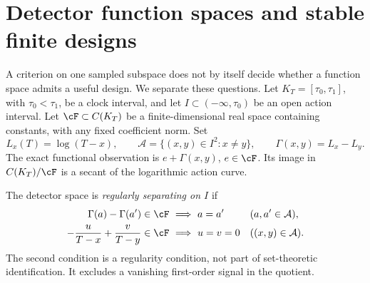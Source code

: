 \section{Detector function spaces and stable finite designs}
\label{sec:v84-spaces}
A criterion on one sampled subspace does not by itself decide whether a
function space admits a useful design. We separate these questions.
Let $K_T=[\tau_0,\tau_1]$, with $\tau_0<\tau_1$, be a clock interval,
and let $I\subset(-\infty,\tau_0)$ be an open action interval.
Let $\cF\subset C(K_T)$ be a finite-dimensional real space containing
constants, with any fixed coefficient norm. Set
\[
 L_x(T)=\log(T-x),\qquad
 \mathcal A=\{(x,y)\in I^2:x\ne y\},\qquad
 \Gamma(x,y)=L_x-L_y.
\]
The exact functional observation is $e+\Gamma(x,y)$, $e\in\cF$.
Its image in $C(K_T)/\cF$ is a secant of the logarithmic action curve.

\begin{definition}\label{def:v84-regular}
The detector space is \emph{regularly separating on $I$} if
\begin{align}
 \Gamma(a)-\Gamma(a')\in\cF&\ \Longrightarrow\ a=a'
                  &&(a,a'\in\mathcal A),\label{eq:v84-secants}\\
 -\frac{u}{T-x}+\frac{v}{T-y}\in\cF&\ \Longrightarrow\ u=v=0
                  &&((x,y)\in\mathcal A).\label{eq:v84-tangents}
\end{align}
The second condition is a regularity condition, not part of set-theoretic
identification. It excludes a vanishing first-order signal in the quotient.
\end{definition}

